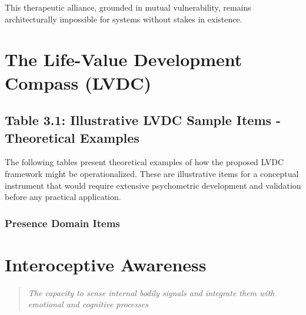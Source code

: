 \documentclass[
  a4paper,
]{report}
\begin{document}
This therapeutic alliance, grounded in mutual vulnerability, remains
architecturally impossible for systems without stakes in existence.

\section{The Life-Value Development Compass
(LVDC)}\label{the-life-value-development-compass-lvdc}

\subsection{Table 3.1: Illustrative LVDC Sample Items - Theoretical
Examples}\label{table-3.1-illustrative-lvdc-sample-items---theoretical-examples}

\begin{tcolorbox}[enhanced jigsaw, toprule=.15mm, rightrule=.15mm, breakable, opacitybacktitle=0.6, colframe=quarto-callout-important-color-frame, colback=white, titlerule=0mm, arc=.35mm, leftrule=.75mm, opacityback=0, colbacktitle=quarto-callout-important-color!10!white, bottomrule=.15mm, coltitle=black, toptitle=1mm, bottomtitle=1mm, title=\textcolor{quarto-callout-important-color}{\faExclamation}\hspace{0.5em}{Important}, left=2mm]

The following tables present theoretical examples of how the proposed
LVDC framework might be operationalized. These are illustrative items
for a conceptual instrument that would require extensive psychometric
development and validation before any practical application.

\end{tcolorbox}

\subsubsection{Presence Domain Items}\label{presence-domain-items}

\section{Interoceptive Awareness}

\begin{quote}
\emph{The capacity to sense internal bodily signals and integrate them
with emotional and cognitive processes}
\end{quote}
\end{document}

